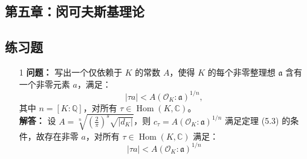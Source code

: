 \documentclass[UTF8]{ctexart}
\begin{document}
\begin{enumerate}
\section{第五章：闵可夫斯基理论}

\subsection{练习题}

\begin{enumerate}

\item[1] 
\textbf{问题：} 写出一个仅依赖于 \(K\) 的常数 \(A\)，使得 \(K\) 的每个非零整理想 \(\mathfrak{a}\) 含有一个非零元素 \(a\)，满足：
\[
|\tau a| < A (\mathcal{O}_K : \mathfrak{a})^{1/n},
\]
其中 \(n = [K : \mathbb{Q}]\)，对所有 \(\tau \in \operatorname{Hom}(K, \mathbb{C})\)。\\
\textbf{解答：} 设 \(A = \sqrt[n]{(\frac{2}{\pi})^s \sqrt{|d_K|}}\)，则 \(c_\tau = A (\mathcal{O}_K : \mathfrak{a})^{1/n}\) 满足定理 (5.3) 的条件，故存在非零 \(a\)，对所有 \(\tau \in \operatorname{Hom}(K, \mathbb{C})\) 满足：
\[
|\tau a| < A (\mathcal{O}_K : \mathfrak{a})^{1/n}
\]


\end{enumerate}
\end{enumerate}
\end{document}
